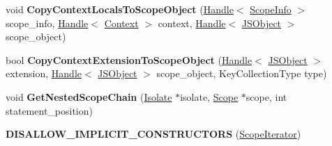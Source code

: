 \begin{DoxyCompactItemize}
\item 
void {\bfseries Copy\+Context\+Locals\+To\+Scope\+Object} (\hyperlink{classv8_1_1internal_1_1_handle}{Handle}$<$ \hyperlink{classv8_1_1internal_1_1_scope_info}{Scope\+Info} $>$ scope\+\_\+info, \hyperlink{classv8_1_1internal_1_1_handle}{Handle}$<$ \hyperlink{classv8_1_1internal_1_1_context}{Context} $>$ context, \hyperlink{classv8_1_1internal_1_1_handle}{Handle}$<$ \hyperlink{classv8_1_1internal_1_1_j_s_object}{J\+S\+Object} $>$ scope\+\_\+object)\hypertarget{classv8_1_1internal_1_1_scope_iterator_a19346199e089395616231a53c291d228}{}\label{classv8_1_1internal_1_1_scope_iterator_a19346199e089395616231a53c291d228}

\item 
bool {\bfseries Copy\+Context\+Extension\+To\+Scope\+Object} (\hyperlink{classv8_1_1internal_1_1_handle}{Handle}$<$ \hyperlink{classv8_1_1internal_1_1_j_s_object}{J\+S\+Object} $>$ extension, \hyperlink{classv8_1_1internal_1_1_handle}{Handle}$<$ \hyperlink{classv8_1_1internal_1_1_j_s_object}{J\+S\+Object} $>$ scope\+\_\+object, Key\+Collection\+Type type)\hypertarget{classv8_1_1internal_1_1_scope_iterator_a255dd42e2a29864c0d0820fa037ed9d6}{}\label{classv8_1_1internal_1_1_scope_iterator_a255dd42e2a29864c0d0820fa037ed9d6}

\item 
void {\bfseries Get\+Nested\+Scope\+Chain} (\hyperlink{classv8_1_1internal_1_1_isolate}{Isolate} $\ast$isolate, \hyperlink{classv8_1_1internal_1_1_scope}{Scope} $\ast$scope, int statement\+\_\+position)\hypertarget{classv8_1_1internal_1_1_scope_iterator_ab4489696bc3a6b5959cfcb64b8bb202a}{}\label{classv8_1_1internal_1_1_scope_iterator_ab4489696bc3a6b5959cfcb64b8bb202a}

\item 
{\bfseries D\+I\+S\+A\+L\+L\+O\+W\+\_\+\+I\+M\+P\+L\+I\+C\+I\+T\+\_\+\+C\+O\+N\+S\+T\+R\+U\+C\+T\+O\+RS} (\hyperlink{classv8_1_1internal_1_1_scope_iterator}{Scope\+Iterator})\hypertarget{classv8_1_1internal_1_1_scope_iterator_ae0a9f78da4ef12cfb704b4b303c055a1}{}\label{classv8_1_1internal_1_1_scope_iterator_ae0a9f78da4ef12cfb704b4b303c055a1}

\end{DoxyCompactItemize}
